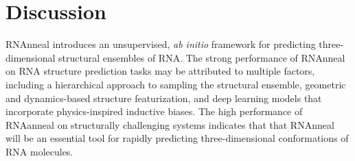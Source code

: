 




\section{Discussion}

RNAnneal introduces an unsupervised, {\it ab initio} framework for predicting three-dimensional structural ensembles of RNA. The strong performance of RNAnneal on RNA structure prediction tasks may be attributed to multiple factors, including a hierarchical approach to sampling the structural ensemble, geometric and dynamics-based structure featurization, and deep learning models that incorporate physics-inspired inductive biases. The high performance of RNAanneal on structurally challenging systems indicates that that RNAnneal will be an essential tool for rapidly predicting three-dimensional conformations of RNA molecules.

